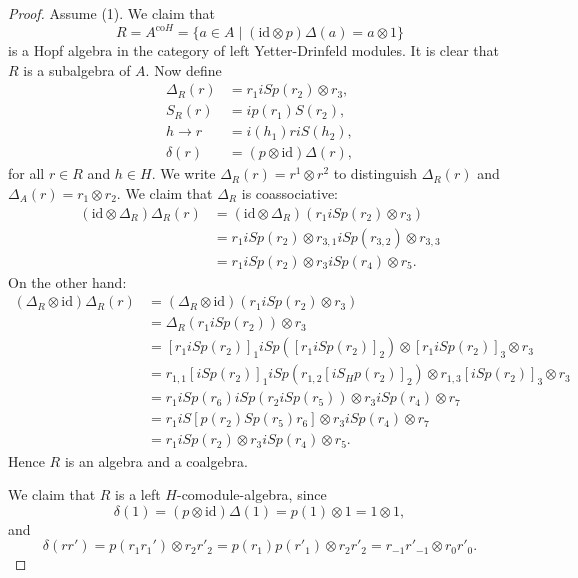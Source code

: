 \begin{proof}
Assume (1). We claim that 
\[
R=A^{\textrm{co}H}=\{a\in A\mid(\textrm{id}\otimes p)\Delta(a)=a\otimes1\}
\]
is a Hopf algebra in the category of left Yetter-Drinfeld modules.
It is clear that $R$ is a subalgebra of $A$. Now define
\begin{align*}
\Delta_{R}(r) & =r_{1}iSp(r_{2})\otimes r_{3},\\
S_{R}(r) & =ip(r_{1})S(r_{2}),\\
h\to r & =i(h_{1})riS(h_{2}),\\
\delta(r) & =(p\otimes\textrm{id})\Delta(r),
\end{align*}
for all $r\in R$ and $h\in H$. 
We write $\Delta_{R}(r)=r^{1}\otimes r^{2}$ to distinguish $\Delta_{R}(r)$
and $\Delta_{A}(r)=r_{1}\otimes r_{2}$. We claim that $\Delta_{R}$
is coassociative:
\begin{align*}
(\textrm{id}\otimes\Delta_{R})\Delta_{R}(r) & =(\textrm{id}\otimes\Delta_{R})(r_{1}iSp(r_{2})\otimes r_{3})\\
 & =r_{1}iSp(r_{2})\otimes r_{3,1}iSp(r_{3,2})\otimes r_{3,3}\\
 & =r_{1}iSp(r_{2})\otimes r_{3}iSp(r_{4})\otimes r_{5}.
 \end{align*}
On the other hand:
\begin{align*}
(\Delta_{R}\otimes\textrm{id})\Delta_{R}(r) & =(\Delta_{R}\otimes\textrm{id})(r_{1}iSp(r_{2})\otimes r_{3})\\
 & =\Delta_{R}(r_{1}iSp(r_{2}))\otimes r_{3}\\
 & =[r_{1}iSp(r_{2})]_{1}iSp([r_{1}iSp(r_{2})]_{2})\otimes[r_{1}iSp(r_{2})]_{3}\otimes r_{3}\\
 & =r_{1,1}[iSp(r_{2})]_{1}iSp(r_{1,2}[iS_{H}p(r_{2})]_{2})\otimes r_{1,3}[iSp(r_{2})]_{3}\otimes r_{3}\\
 & =r_{1}iSp(r_{6})iSp(r_{2}iSp(r_{5}))\otimes r_{3}iSp(r_{4})\otimes r_{7}\\
 & =r_{1}iS[p(r_{2})Sp(r_{5})r_{6}]\otimes r_{3}iSp(r_{4})\otimes r_{7}\\
 & =r_{1}iSp(r_{2})\otimes r_{3}iSp(r_{4})\otimes r_{5}.\end{align*}
Hence $R$ is an algebra and a coalgebra. 

We claim that $R$ is a left $H$-comodule-algebra, since \[
\delta(1)=(p\otimes\textrm{id})\Delta(1)=p(1)\otimes1=1\otimes1,\]
and \[
\delta(rr')=p(r_{1}r_{1}')\otimes r_{2}r'_{2}=p(r_{1})p(r'_{1})\otimes r_{2}r'_{2}=r_{-1}r'_{-1}\otimes r_{0}r'_{0}.\]


\end{proof}
